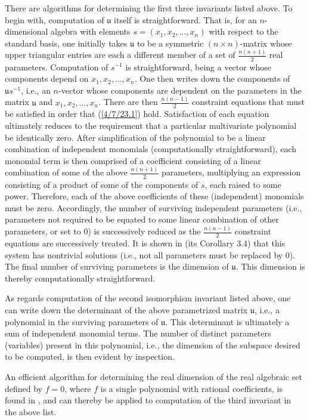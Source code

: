 \documentclass{amsart}
\numberwithin{equation}{section}
\theoremstyle{definition}
\numberwithin{theorem}{section}
\begin{document}
There are algorithms for determining the first three invariants listed above.  To begin with, computation of $\mathfrak{u}$ itself is straightforward.  That is, for an $n$-dimensional algebra with elements $s = (x_1,x_2,\dots,x_n)$ with respect to the standard basis, one initially takes $\mathfrak{u}$ to be a symmetric $(n\times n)$-matrix  whose upper triangular entries are each a different member of a set of $\frac{n(n+1)}{2}$ real parameters.  Computation of $s^{-1}$ is straightforward, being a vector whose components depend on $x_1,x_2,\dots,x_n$.  One then writes down the components of $\mathfrak{u}s^{-1}$, i.e., an $n$-vector whose components are dependent on the parameters in the matrix $\mathfrak{u}$ and $x_1,x_2,\dots,x_n$.  There are then $\frac{n(n-1)}{2}$ constraint equations that must be satisfied in order that (\ref{4/7/23.1}) hold.  Satisfaction of each equation ultimately reduces to the requirement that a particular multivariate polynomial be identically zero.  After simplification of the polynomial to be a linear combination of independent monomials (computationally straightforward), each monomial term is then comprised of a coefficient consisting of a linear combination of some of the above $\frac{n(n+1)}{2}$ parameters, multiplying an expression consisting of a product of some of the components of $s$, each raised to some power.  Therefore, each of the above coefficients of these (independent) monomials must be zero.  Accordingly, the number of surviving independent parameters (i.e., parameters not required to be equated to some linear combination of other parameters, or set to 0) is successively reduced as the $\frac{n(n-1)}{2}$ constraint equations are successively treated. It is shown in \cite{fgreensite:2023} (its Corollary 3.4) that this system has nontrivial solutions (i.e., not all parameters must be replaced by 0).   The final number of surviving parameters is the dimension of $\mathfrak{u}$.  This dimension is thereby computationally straightforward.

As regards computation of the second isomorphism invariant listed above, one can write down the determinant of the above parametrized matrix $\mathfrak{u}$, i.e., a polynomial in the surviving parameters of $\mathfrak{u}$.  This determinant is ultimately a sum of independent monomial terms.  The number of distinct parameters (variables) present in this polynomial, i.e., the dimension of the subspace desired to be computed, is then evident by inspection.

An efficient algorithm for determining the real dimension of the real algebraic set defined by $f=0$, where $f$ is a single polynomial with rational coefficients, is found in \cite{bannwarth:2015}, and can thereby be applied to computation of the third invariant in the above list. 
\end{document}
